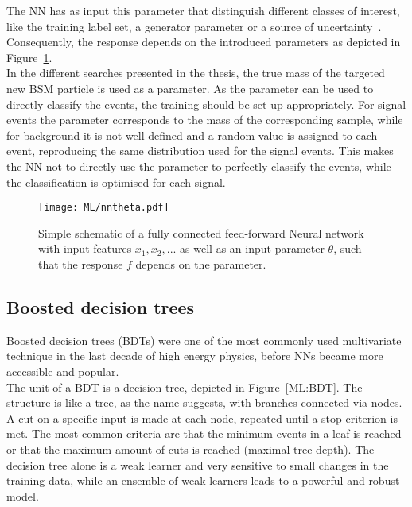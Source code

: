 The NN has as input this parameter that distinguish different classes of interest, like the training label set, a generator parameter or a source of uncertainty~\cite{Ghosh_2021}. Consequently, the response depends on the introduced parameters as depicted in Figure~\ref{ML:PNN}.\\

In the different searches presented in the thesis, the true mass of the targeted new BSM particle is used as a parameter. As the parameter can be used to directly classify the events, the training should be set up appropriately. For signal events the parameter corresponds to the mass of the corresponding sample, while for background it is not well-defined and a random value is assigned to each event, reproducing the same distribution used for the signal events. This makes the NN not to directly use the parameter to perfectly classify the events, while the classification is optimised for each signal.

\begin{figure}[htbp]
    \RawFloats
    \begin{center}
    \texttt{[image: ML/nntheta.pdf]}
    \caption{
        Simple schematic of a fully connected feed-forward Neural network with input features $x_1, x_2,...$ as well as an input parameter $\theta$, such that the response $f$ depends on the parameter.
    }
    \label{ML:PNN}
    \end{center}
\end{figure}

\subsection{Boosted decision trees}

Boosted decision trees (BDTs) were one of the most commonly used multivariate technique in the last decade of high energy physics, before NNs became more accessible and popular. \\

The unit of a BDT is a decision tree, depicted in Figure~\ref{ML:BDT}. The structure is like a tree, as the name suggests, with branches connected via nodes. A cut on a specific input is made at each node, repeated until a stop criterion is met. The most common criteria are that the minimum events in a leaf is reached or that the maximum amount of cuts is reached (maximal tree depth). The decision tree alone is a weak learner and very sensitive to small changes in the training data, while an ensemble of weak learners leads to a powerful and robust model.



